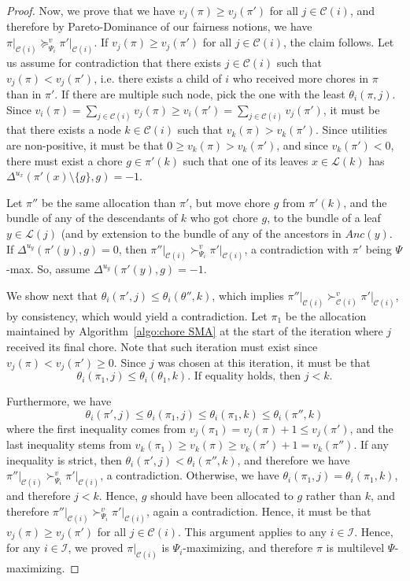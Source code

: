 \documentclass[]{article}
\newcommand{\children}{\mathcal{C}}
\newcommand{\leaves}{\mathcal{L}}
\newcommand{\internal}{\mathcal{I}}
\newcommand{\ancestors}{Anc}
\begin{document}
\begin{proof}
    Now, we prove that we have $v_j(\pi) \geq v_j(\pi')$ for all $j \in \children(i)$, and therefore by Pareto-Dominance of our fairness notions, we have $\pi \vert_{\children(i)} 
    \succeq^v_{\Psi_i} \pi' \vert_{\children(i)}$. If $v_j(\pi) \geq v_j(\pi')$ for all $j \in \children(i)$, the claim follows. Let us assume for contradiction that there exists $j \in \children(i)$ such that $v_j(\pi) < v_j(\pi')$, i.e. there exists a child of $i$ who received more chores in $\pi$ than in $\pi'$. If there are multiple such node, pick the one with the least $\theta_i(\pi, j)$. Since $v_i(\pi) = \sum_{j \in \children(i)} v_j(\pi) \geq v_i(\pi') = \sum_{j \in \children(i)} v_j(\pi')$, it must be that there exists a node $k \in \children(i)$ such that $v_k(\pi) > v_k(\pi')$. Since utilities are non-positive, it must be that $0 \geq v_k(\pi) > v_k(\pi')$, and since $v_k(\pi') < 0$, there must exist a chore $g \in \pi'(k)$ such that one of its leaves $x \in \leaves(k)$ has $\Delta^{u_x}(\pi'(x) \setminus \{g\}, g) = -1$. 

    Let $\pi''$ be the same allocation than $\pi'$, but move chore $g$ from $\pi'(k)$, and the bundle of any of the descendants of $k$ who got chore $g$, to the bundle of a leaf $y \in \leaves(j)$ (and by extension to the bundle of any of the ancestors in $\ancestors(y)$. If $\Delta^{u_y}(\pi'(y), g) = 0$, then $\pi'' \vert_{\children(i)} \succ^v_{\Psi_i} \pi' \vert_{\children(i)}$, a contradiction with $\pi'$ being $\Psi$-max. So, assume $\Delta^{u_y}(\pi'(y), g) = -1$. 

    We show next that $\theta_i(\pi', j) \leq \theta_i(\theta'', k)$, which implies $\pi'' \vert_{\children(i)} \succ^v_{\children(i)} \pi' \vert_{\children(i)}$, by consistency, which would yield a contradiction. Let $\pi_1$ be the allocation maintained by Algorithm~\ref{algo:chore SMA} at the start of the iteration where $j$ received its final chore. Note that such iteration must exist since $v_j(\pi) < v_j(\pi') \geq 0$. Since $j$ was chosen at this iteration, it must be that $$\theta_i(\pi_1, j) \leq \theta_i(\theta_1, k). \text{ If equality holds, then $j < k$.}$$

    Furthermore, we have $$\theta_i(\pi', j) \leq \theta_i(\pi_1, j) \leq \theta_i(\pi_1, k) \leq \theta_i(\pi'', k)$$ where the first inequality comes from $v_j(\pi_1) = v_j(\pi) + 1 \leq v_j(\pi')$, and the last inequality stems from $v_k(\pi_1) \geq v_k(\pi) \geq v_k(\pi') + 1 = v_k(\pi'')$. If any inequality is strict, then $\theta_i(\pi', j) < \theta_i(\pi'', k)$, and therefore we have $\pi'' \vert_{\children(i)} \succ^v_{\Psi_i} \pi' \vert_{\children(i)}$, a contradiction. Otherwise, we have $\theta_i(\pi_1, j) = \theta_i(\pi_1, k)$, and therefore $j < k$. Hence, $g$ should have been allocated to $g$ rather than $k$, and therefore $\pi'' \vert_{\children(i)} \succ^v_{\Psi_i} \pi' \vert_{\children(i)}$, again a contradiction. Hence, it must be that $v_j(\pi) \geq v_j(\pi')$  for all $j \in \children(i)$. This argument applies to any $i \in \internal$. Hence, for any $i \in \internal$, we proved $\pi \vert_{\children(i)}$ is $\Psi_i$-maximizing, and therefore $\pi$ is multilevel $\Psi$-maximizing. 
\end{proof}
\end{document}
